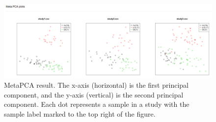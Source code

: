 \begin{figure}[H]
\begin{center}
\includegraphics[scale=0.3]{./figure/metaPCA/metaPCA}
\caption{MetaPCA result.
The x-axis (horizontal) is the first principal component, 
and the y-axis (vertical) is the second principal component.
Each dot represents a sample in a study with the sample label marked to the top right of the figure.
}
\label{fig:metaPCAresult}
\end{center}
\end{figure}

